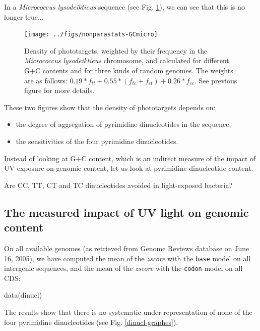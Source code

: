 \documentclass{article}
\begin{document}
In a \textit{Micrococcus lysodeikticus} sequence (see Fig.
\ref{GCmicro}), we can see that this is no longer true...


\begin{figure}[H]
   \begin{center}
\texttt{[image: ../figs/nonparastats-GCmicro]}
\end{center}
\caption{Density of phototargets, weighted by their frequency in the
  \textit{Micrococcus lysodeikticus} chromosome, and calculated for
  different G+C contents and for three kinds of random genomes. The
  weights are as follows:
  $0.19*f_{tt}+0.55*(f_{tc}+f_{ct})+0.26*f_{cc}$. See previous figure
  for more details.}
\label{GCmicro}
\end{figure}

These two figures show that the density of phototargets depends on:

\begin{itemize}
\item the degree of aggregation of pyrimidine dinucleotides in the
sequence,
\item the sensitivities of the four pyrimidine dinucleotides.
  \end{itemize}

Instead of looking at G+C content, which is an indirect measure of the
impact of UV exposure on genomic content, let us look at pyrimidine
dinucleotide content.

Are CC, TT, CT and TC dinucleotides avoided in light-exposed bacteria?

\subsection{The measured impact of UV light on genomic content}

On all available genomes (as retrieved from Genome Reviews database on
June 16, 2005), we have computed the mean of the \textit{zscore} with
the \texttt{base} model on all intergenic sequences, and the mean of
the \textit{zscore} with the \texttt{codon} model on all CDS:

\begin{Schunk}
\begin{Sinput}
 data(dinucl)
\end{Sinput}
\end{Schunk}

The results show that there is no systematic under-representation of
none of the four pyrimidine dinucleotides (see Fig.
\ref{dinucl-graphes}).
\end{document}
